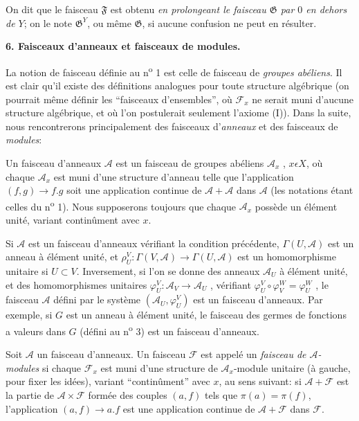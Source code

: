 On dit que le faisceau $\mathfrak{F}$ est obtenu \textit{en prolongeant le faisceau $\mathfrak{G}$ par $0$ en dehors de $Y$}; on le note $\mathfrak{G}^{Y}$, ou même $\mathfrak{G}$, si aucune confusion ne peut en résulter.


\textbf{6. Faisceaux d'anneaux et faisceaux de modules.}

La notion de faisceau définie au n\textsuperscript{o} 1 est celle de faisceau de \textit{groupes abéliens}. Il est clair qu'il existe
des définitions analogues pour toute structure algébrique (on pourrait même définir les ``faisceaux d'ensembles'', où $\mathcal{F}_x$ ne serait muni d'aucune structure algébrique, et où l'on postulerait seulement l'axiome (I)). Dans la suite, nous rencontrerons principalement des faisceaux d'\emph{anneaux} et des faisceaux de \emph{modules}:

Un faisceau d'anneaux $\mathcal{A}$ est un faisceau de groupes abéliens $\mathcal{A}_x$ , $x \epsilon X$, où chaque $\mathcal{A}_x$ est muni d'une structure d'anneau telle que l'application $(f, g) \to f.g$ soit une application continue de $\mathcal{A} + \mathcal{A}$ dans $\mathcal{A}$ (les notations étant celles du n\textsuperscript{o} 1). Nous supposerons toujours que chaque $\mathcal{A}_x$ possède un élément unité, variant continûment avec $x$.

Si $\mathcal{A}$ est un faisceau d'anneaux vérifiant la condition précédente, $\Gamma(U, \mathcal{A})$ est un anneau à élément unité, et $\rho_U^V : \Gamma(V, \mathcal{A}) \to \Gamma(U, \mathcal{A})$ est un homomorphisme unitaire si $U \subset V$. Inversement, si l'on se donne des anneaux $\mathcal{A}_U$ à élément unité, et des homomorphismes unitaires $\varphi_U^V : \mathcal{A}_V \to \mathcal{A}_U$ , vérifiant $\varphi_U^V \circ \varphi_V^W = \varphi_U^W$ , le faisceau $\mathcal{A}$ défini par le système $(\mathcal{A}_U , \varphi_U^V)$ est un faisceau d'anneaux. Par exemple, si $G$ est un anneau à élément unité, le faisceau des germes de fonctions a valeurs dans $G$ (défini au n\textsuperscript{o} 3) est un faisceau d'anneaux.

Soit $\mathcal{A}$ un faisceau d'anneaux. Un faisceau $\mathcal{F}$ est appelé un \emph{faisceau de $\mathcal{A}$-modules} si chaque $\mathcal{F}_x$ est muni d'une structure de $\mathcal{A}_x$-module unitaire (à gauche, pour fixer les idées), variant ``continûment'' avec $x$, au sens suivant: si $\mathcal{A} + \mathcal{F}$ est la partie de $\mathcal{A} \times \mathcal{F}$ formée des couples $(a, f)$ tels que $\pi(a) = \pi(f)$, l'application $(a, f) \to a.f$ est une application continue de $\mathcal{A} + \mathcal{F}$ dans $\mathcal{F}$.

